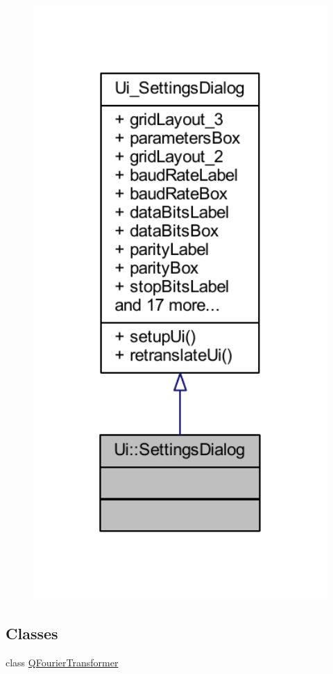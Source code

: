 \begin{figure}[H]
\begin{center}
\leavevmode
\includegraphics[width=350pt]{dc/d50/a00332}
\end{center}
\end{figure}
\subsection*{Classes}
\begin{DoxyCompactItemize}
\item 
class \hyperlink{a00054}{Q\+Fourier\+Transformer}
\end{DoxyCompactItemize}
